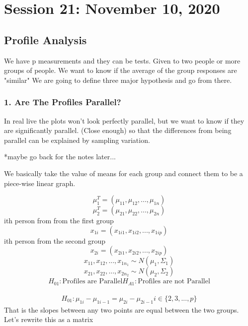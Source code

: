 \chapter{Session 21: November 10, 2020}

\section*{Profile Analysis}
We have p measurements and they can be tests.
Given to two people or more groups of people. We want to know if the average of the group responses are "similar" We are going to define three major hypothesis and go from there.

\subsection*{1. Are The Profiles Parallel?}

In real live the plots won't look perfectly parallel, but we want to know if they are significantly parallel. (Close enough) so that the differences from being parallel can be explained by sampling variation.

*maybe go back for the notes later...

We basically take the value of means for each group and connect them to be a piece-wise linear graph.

\[\mu_1^T = (\mu_{11},\mu_{12},...,\mu_{1n})\]
\[\mu_2^T = (\mu_{21},\mu_{22},...,\mu_{2n})\]
ith person from from the first group
\[x_{1i}= (x_{1i1},x_{1i2},...,x_{1ip})\]
ith person from the second group
\[x_{2i}= (x_{2i1},x_{2i2},...,x_{2ip})\]
\[x_{11},x_{12},...,x_{1n_1}\sim N(\mu_1,\Sigma_1)\]
\[x_{21},x_{22},...,x_{2n_2}\sim N(\mu_2,\Sigma_2)\]
\begin{gather*}
    H_{01}: \text{Profiles are Parallel}
    H_{A1}:\text{Profiles are not Parallel}
\end{gather*}

\begin{gather*}
    H_{01}: \mu_{1i}-\mu_{1i-1}=\mu_{2i}-\mu_{2i-1} i \in \{2,3,...,p\} 
\end{gather*}
That is the slopes between any two points are equal between the two groups. Let's rewrite this as a matrix

